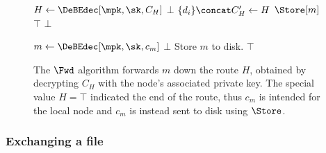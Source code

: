 \begin{figure}[t]
  \begin{algorithmic}[1]
      \State $H\gets \DeBEdec[\mpk, \sk, C_H]$
        \State \Return $\bot$
      \EndIf
      \State $\{d_i\}\concat C_H'\gets H$
        \State \Return $\Store[m]$
      \EndIf
          \State \Return $\top$
        \EndIf
      \EndFor
      \State \Return $\bot$
    \EndFunction
  \end{algorithmic}

  \begin{algorithmic}[1]
      \State $m\gets \DeBEdec[\mpk, \sk, c_m]$
        \State \Return $\bot$
      \EndIf
      \State Store $m$ to disk.
      \State \Return $\top$
    \EndFunction
  \end{algorithmic}
  \caption{\label{SPORFwd}%
    The \(\Fwd\) algorithm forwards \(m\) down the route \(H\), obtained 
    by decrypting \(C_H\) with the node's associated private key.
    The special value \(H = \top\) indicated the end of the route, thus \(c_m\) 
    is intended for the local node and \(c_m\) is instead sent to disk using 
    \(\Store\).%
  }
\end{figure}

\subsubsection{Exchanging a file} %
\label{ssub:exchanging_a_file}

